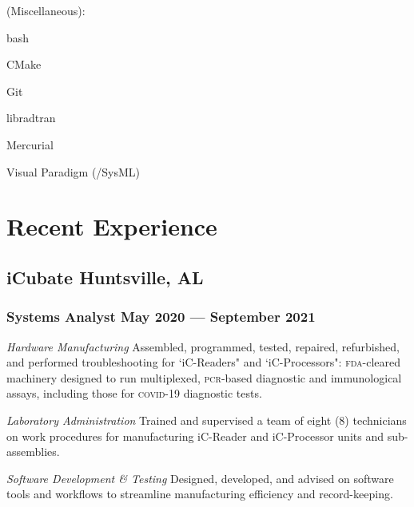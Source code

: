 \documentclass[letterpaper, oneside, 10pt]{article}
\begin{document}
\begin{multicols}{2}
{  {\jostmedium (Miscellaneous):}%
    \begin{itemize*}[%
      label=\relax, labelwidth=0pt, itemjoin=\space\char"00B7%
    ]%
      \item bash%
      \item CMake%
      \item {}%
      \item Git%
      \item {}%
      \item libradtran%
      \item Mercurial%
      \item {}%
      \item Visual Paradigm (/SysML)%
    \end{itemize*}
  }
\end{multicols}

\section*{Recent Experience} %

\hfill
\vspace{-24pt}


\subsection*{iCubate\DotSep{0.25em} Huntsville, AL}
\subsubsection*{Systems Analyst\DotSep{0.25em} May 2020 --- September 2021}

\textit{Hardware Manufacturing}\DotSep{0.25em}
Assembled, programmed, tested, repaired, refurbished, and performed
troubleshooting for `iC-Readers" and `iC-Processors": \textsc{fda}-cleared
machinery designed to run multiplexed, \textsc{pcr}-based diagnostic and
immunological assays, including those for \textsc{covid}-19 diagnostic tests.

\textit{Laboratory Administration}\DotSep{0.25em}
Trained and supervised a team of eight (8) technicians on work procedures for
manufacturing iC-Reader and iC-Processor units and sub-assemblies.

\textit{Software Development \& Testing}\DotSep{0.25em}
Designed, developed, and advised on software tools and workflows to streamline
manufacturing efficiency and record-keeping.
\end{document}
